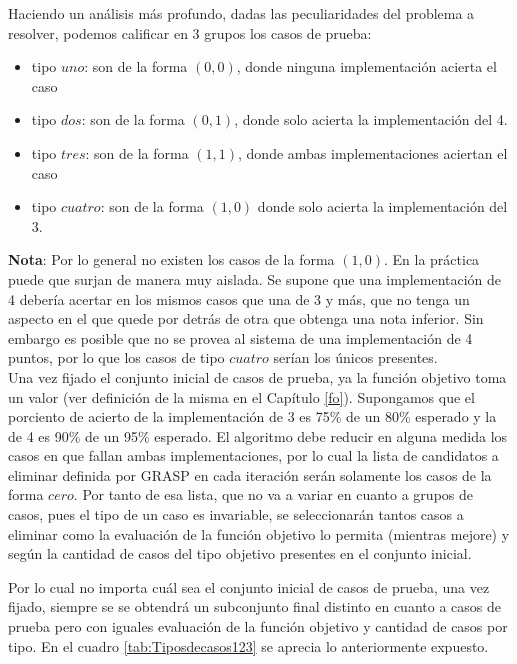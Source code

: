 \documentclass[a4paper,12pt]{book}
\begin{document}
	Haciendo un análisis más profundo, dadas las peculiaridades del problema a resolver, podemos calificar en 3 grupos los casos de prueba:
	\begin{itemize}
		\item tipo $uno$: son de la forma $(0, 0)$, donde ninguna implementación acierta el caso
		\item tipo $dos$: son de la forma $(0, 1)$, donde solo acierta la implementación del 4.
		\item tipo $tres$: son de la forma $(1, 1)$, donde ambas implementaciones aciertan el caso
		\item tipo $cuatro$: son de la forma $(1, 0)$ donde solo acierta la implementación del 3.
	\end{itemize}

	\textbf{Nota}: Por lo general no existen los casos de la forma $(1, 0)$. En la práctica puede que surjan de manera muy aislada. Se supone que una implementación de 4 debería acertar en los mismos casos que una de 3 y más, que no tenga un aspecto en el que quede por detrás de otra que obtenga una nota inferior. Sin embargo es posible que no se provea al sistema de una implementación de 4 puntos, por lo que los casos de tipo $cuatro$ serían los únicos presentes.\\
 
 	Una vez fijado el conjunto inicial de casos de prueba, ya la función objetivo toma un valor (ver definición de la misma en el Capítulo \ref{fo}). Supongamos que el porciento de acierto de la implementación de 3 es 75\% de un 80\% esperado y la de 4 es 90\% de un 95\% esperado. El algoritmo debe reducir en alguna medida los casos en que fallan ambas implementaciones, por lo cual la lista de candidatos a eliminar definida por GRASP en cada iteración serán solamente los casos de la forma $cero$. Por tanto de esa lista, que no va a variar en cuanto a grupos de casos, pues el tipo de un caso es invariable, se seleccionarán tantos casos a eliminar como la evaluación de la función objetivo lo permita (mientras mejore) y según la cantidad de casos del tipo objetivo presentes en el conjunto inicial.
 	
 	Por lo cual no importa cuál sea el conjunto inicial de casos de prueba, una vez fijado, siempre se se obtendrá un subconjunto final distinto en cuanto a casos de prueba pero con iguales evaluación de la función objetivo y cantidad de casos por tipo. En el cuadro \ref{tab:Tiposdecasos123} se aprecia lo anteriormente expuesto. \\
 	
\end{document}

